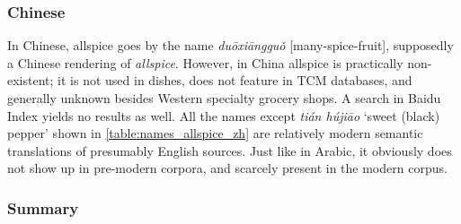 

\subsubsection{Chinese}



In Chinese, allspice goes by the name  \textit{duōxiāngguǒ} [many-spice-fruit], supposedly a Chinese rendering of \textit{allspice}. However, in China allspice is practically non-existent; it is not used in dishes, does not feature in \gls{TCM} databases, and generally unknown besides Western specialty grocery shops. A search in Baidu Index yields no results as well. All the names except  \textit{tián hújiāo} `sweet (black) pepper' shown in \cref{table:names_allspice_zh} are relatively modern semantic translations of presumably English sources. Just like in Arabic, it obviously does not show up in pre-modern corpora, and scarcely present in the modern corpus.



\subsubsection{Summary}












